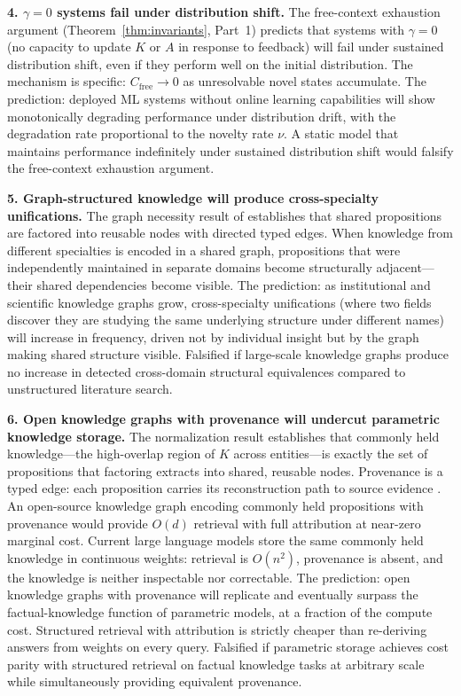 \documentclass[11pt]{article}
\theoremstyle{definition}
\theoremstyle{remark}
\begin{document}
\textbf{4. $\gamma = 0$ systems fail under distribution shift.}
The free-context exhaustion argument
(Theorem~\ref{thm:invariants}, Part~1) predicts that systems with
$\gamma = 0$ (no capacity to update $K$ or $A$ in response to
feedback) will fail under sustained distribution shift, even if they
perform well on the initial distribution. The mechanism is specific:
$C_{\mathrm{free}} \to 0$ as unresolvable novel states accumulate.
The prediction: deployed ML systems without online learning
capabilities will show monotonically degrading performance under
distribution drift, with the degradation rate proportional to the
novelty rate $\nu$. A static model that maintains performance
indefinitely under sustained distribution shift would falsify the
free-context exhaustion argument.

\textbf{5. Graph-structured knowledge will produce cross-specialty
unifications.}
The graph necessity result of \cite{McCarthy2026a}
establishes that shared propositions are factored into reusable nodes
with directed typed edges. When knowledge from different specialties
is encoded in a shared graph, propositions that were independently
maintained in separate domains become structurally adjacent---their
shared dependencies become visible. The prediction: as institutional
and scientific knowledge graphs grow, cross-specialty unifications
(where two fields discover they are studying the same underlying
structure under different names) will increase in frequency, driven
not by individual insight but by the graph making shared structure
visible. Falsified if large-scale knowledge graphs produce no
increase in detected cross-domain structural equivalences compared
to unstructured literature search.

\textbf{6. Open knowledge graphs with provenance will undercut
parametric knowledge storage.}
The normalization result \cite{McCarthy2026b} establishes that
commonly held knowledge---the high-overlap region of $K$ across
entities---is exactly the set of propositions that factoring extracts
into shared, reusable nodes. Provenance is a typed edge:
each proposition carries its reconstruction path to source evidence
\cite{McCarthy2026a}. An open-source knowledge graph encoding commonly
held propositions with provenance would provide $O(d)$ retrieval with
full attribution at near-zero marginal cost. Current large language
models store the same commonly held knowledge in continuous weights:
retrieval is $O(n^2)$, provenance is absent, and the knowledge is
neither inspectable nor correctable. The prediction: open knowledge
graphs with provenance will replicate and eventually surpass the
factual-knowledge function of parametric models, at a fraction of
the compute cost. Structured retrieval with attribution is
strictly cheaper than re-deriving answers from weights on every query.
Falsified if parametric storage achieves cost parity with structured
retrieval on factual knowledge tasks at arbitrary scale while
simultaneously providing equivalent provenance.
\end{document}

